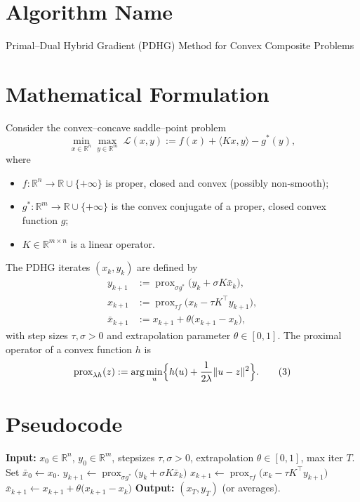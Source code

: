 \documentclass{article}
\newcommand{\prox}{\operatorname{prox}}
\newcommand{\norm}[1]{\|#1\|}
\begin{document}
\section*{Algorithm Name}
Primal–Dual Hybrid Gradient (PDHG) Method for Convex Composite Problems

\section*{Mathematical Formulation}
Consider the convex–concave saddle–point problem
\[
\min_{x\in\mathbb{R}^n}\max_{y\in\mathbb{R}^m}
\;\mathcal{L}(x,y):= f(x)+\langle Kx,y\rangle - g^{*}(y),
\tag{1}
\]
where  

\begin{itemize}[noitemsep]
\item $f:\mathbb{R}^n\to\mathbb{R}\cup\{+\infty\}$ is proper, closed and convex (possibly non‑smooth);
\item $g^{*}:\mathbb{R}^m\to\mathbb{R}\cup\{+\infty\}$ is the convex conjugate of a proper, closed convex function $g$;
\item $K\in\mathbb{R}^{m\times n}$ is a linear operator.
\end{itemize}

The PDHG iterates $(x_k,y_k)$ are defined by
\[
\boxed{
\begin{aligned}
y_{k+1} &:= \prox_{\sigma g^{*}}\!\bigl(y_k+\sigma K\bar x_k\bigr), \\[4pt]
x_{k+1} &:= \prox_{\tau f}\!\bigl(x_k-\tau K^{\top}y_{k+1}\bigr), \\[4pt]
\bar x_{k+1} &:= x_{k+1}+\theta\bigl(x_{k+1}-x_k\bigr),
\end{aligned}}
\tag{2}
\]
with step sizes $\tau,\sigma>0$ and extrapolation parameter $\theta\in[0,1]$.  
The proximal operator of a convex function $h$ is
\[
\prox_{\lambda h}(z):=\arg\min_{u}\Bigl\{h(u)+\frac{1}{2\lambda}\norm{u-z}^{2}\Bigr\}.
\tag{3}
\]

\section*{Pseudocode}
\begin{algorithm}[H]
\caption{PDHG for \eqref{1}}
\begin{algorithmic}[1]
\State \textbf{Input:} $x_{0}\in\mathbb{R}^{n}$, $y_{0}\in\mathbb{R}^{m}$, stepsizes $\tau,\sigma>0$, extrapolation $\theta\in[0,1]$, max iter $T$.
\State Set $\bar x_{0}\gets x_{0}$.
    \State $y_{k+1}\gets \prox_{\sigma g^{*}}\bigl(y_{k}+\sigma K\bar x_{k}\bigr)$ 
    \State $x_{k+1}\gets \prox_{\tau f}\bigl(x_{k}-\tau K^{\top}y_{k+1}\bigr)$ 
    \State $\bar x_{k+1}\gets x_{k+1}+\theta\bigl(x_{k+1}-x_{k}\bigr)$ 
\EndFor
\State \textbf{Output:} $(x_{T},y_{T})$ (or averages).
\end{algorithmic}
\end{algorithm}
\end{document}
